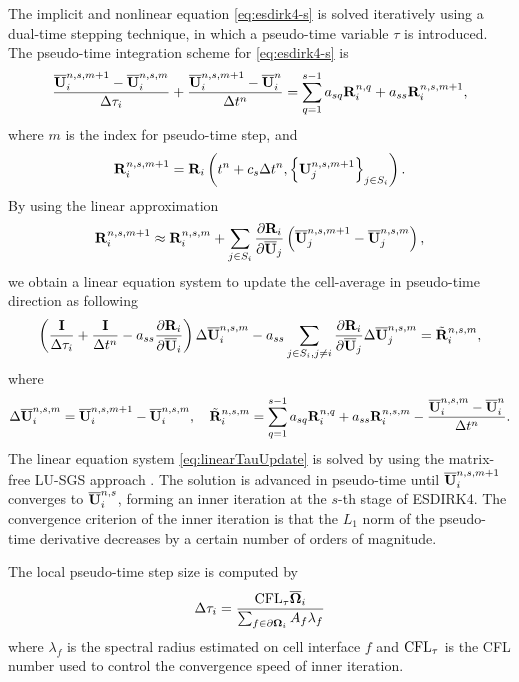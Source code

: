The implicit and nonlinear equation \eqref{eq:esdirk4-s} is solved iteratively using a dual-time stepping technique, in which a pseudo-time variable $\tau$ is introduced. The pseudo-time integration scheme for  \eqref{eq:esdirk4-s} is
\begin{equation}
    \dfrac{\overline{\mathbf{U}}^{n,s,m+1}_i-\overline{\mathbf{U}}^{n,s,m}_i}{\mathrm\Delta \tau_i} + \dfrac{\overline{\mathbf{U}}^{n,s,m+1}_i - \overline{\mathbf{U}}^{n}_i}{\mathrm\Delta t^n} = \sum_{q=1}^{s-1} a_{sq} \mathbf{R}^{n,q}_i + a_{ss} \mathbf{R}_i^{n,s,m+1},
\end{equation}
where $m$ is the index for pseudo-time step, and
\begin{equation}
	\mathbf{R}^{n,s,m+1}_i  = \mathbf{R}_i \left(t^n + c_s \mathrm\Delta t^n, \left\{\mathbf{U}^{n,s,m+1}_j\right\}_{j \in S_i}\right).
\end{equation}
By using the linear approximation
\begin{equation}
	\mathbf{R}^{n,s,m+1}_i \approx \mathbf{R}^{n,s,m}_i + \sum_{j \in S_i} \dfrac{\partial \mathbf{R}_i}{\partial \overline{\mathbf{U}}_j} \left(\overline{\mathbf{U}}^{n,s,m+1}_j-\overline{\mathbf{U}}^{n,s,m}_j\right),
\end{equation}
we obtain a linear equation system to update the cell-average in pseudo-time direction as following
\begin{equation}
    \left(\frac{\eye}{\inc \tau_i} + \frac{\eye}{\inc t^n} -a_{ss}\partialderivative{\R_i }{\uu_i} \right) \inc \uu^{n,s, m}_i
    -
    a_{ss}\sum_{j\in S_i,j\neq i} {
        \partialderivative{\R_i}{\uu_j} \inc \uu^{n,s, m}_j
    }
    = \tilde{\R}^{n,s,m}_i,
    \label{eq:linearTauUpdate}
\end{equation}
where
\begin{equation}
	\label{eq:define-inc}
    \mathrm\Delta \overline{\mathbf{U}}^{n,s,m}_i= \overline{\mathbf{U}}^{n,s,m + 1}_i - \overline{\mathbf{U}}^{n,s,m}_i, \quad \tilde{\mathbf{R}}^{n,s,m}_i= \sum_{q=1}^{s-1} a_{sq} \mathbf{R}^{n,q}_i + a_{ss} \mathbf{R}_i^{n,s,m} - \dfrac{\overline{\mathbf{U}}^{n,s,m}_i - \overline{\mathbf{U}}^{n}_i}{\mathrm\Delta t^n}.
\end{equation}
The linear equation system \eqref{eq:linearTauUpdate} is solved by using the matrix-free LU-SGS approach \cite{luo1998fast}. The solution is advanced in pseudo-time until $\overline{\mathbf{U}}^{n,s,m+1}_{i}$ converges to $\overline{\mathbf{U}}^{n,s}_{i}$, forming an inner iteration at the $s$-th stage of ESDIRK4. The convergence criterion of the inner iteration is that the $L_1$ norm of the pseudo-time derivative decreases by a certain number of orders of magnitude.   

The local pseudo-time step size is computed by
\begin{equation}
	\mathrm\Delta \tau_{i} = \frac{\text{CFL}_\tau \overline{\mathbf{\Omega}}_i }
	{\sum_{f \in \partial \mathbf{\Omega}_i}{A_f}\lambda_{f}}
\end{equation}
where $\lambda_{f}$ is the spectral radius estimated on cell interface $f$ and $\text{CFL}_\tau$ is the CFL number used to control the convergence speed of inner iteration.


